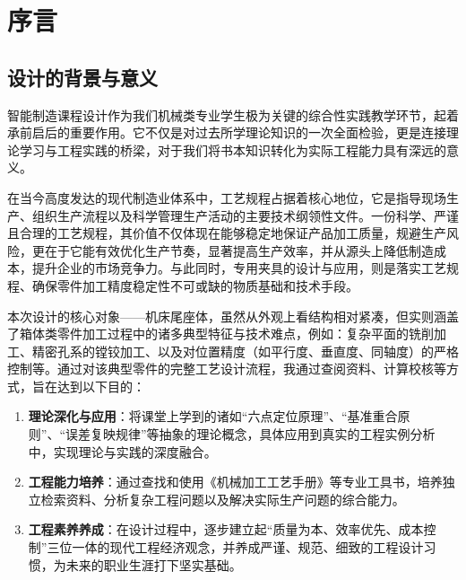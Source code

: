 \documentclass[withoutpreface,bwprint]{cumcmthesis}
\begin{document}
\newpage


\tableofcontents
\newpage
{}
\setcounter{page}{1}

\setlength{\parskip}{0.8ex plus 0.2ex minus 0.1ex}

\section{序言}

\subsection{设计的背景与意义}
智能制造课程设计作为我们机械类专业学生极为关键的综合性实践教学环节，起着承前启后的重要作用。它不仅是对过去所学理论知识的一次全面检验，更是连接理论学习与工程实践的桥梁，对于我们将书本知识转化为实际工程能力具有深远的意义。

在当今高度发达的现代制造业体系中，工艺规程占据着核心地位，它是指导现场生产、组织生产流程以及科学管理生产活动的主要技术纲领性文件。一份科学、严谨且合理的工艺规程，其价值不仅体现在能够稳定地保证产品加工质量，规避生产风险，更在于它能有效优化生产节奏，显著提高生产效率，并从源头上降低制造成本，提升企业的市场竞争力。与此同时，专用夹具的设计与应用，则是落实工艺规程、确保零件加工精度稳定性不可或缺的物质基础和技术手段。

本次设计的核心对象——机床尾座体，虽然从外观上看结构相对紧凑，但实则涵盖了箱体类零件加工过程中的诸多典型特征与技术难点，例如：复杂平面的铣削加工、精密孔系的镗铰加工、以及对位置精度（如平行度、垂直度、同轴度）的严格控制等。通过对该典型零件的完整工艺设计流程，我通过查阅资料、计算校核等方式，旨在达到以下目的：
\begin{enumerate}
    \item \textbf{理论深化与应用}：将课堂上学到的诸如“六点定位原理”、“基准重合原则”、“误差复映规律”等抽象的理论概念，具体应用到真实的工程实例分析中，实现理论与实践的深度融合。
    \item \textbf{工程能力培养}：通过查找和使用《机械加工工艺手册》等专业工具书，培养独立检索资料、分析复杂工程问题以及解决实际生产问题的综合能力。
    \item \textbf{工程素养养成}：在设计过程中，逐步建立起“质量为本、效率优先、成本控制”三位一体的现代工程经济观念，并养成严谨、规范、细致的工程设计习惯，为未来的职业生涯打下坚实基础。
\end{enumerate}
\end{document}
